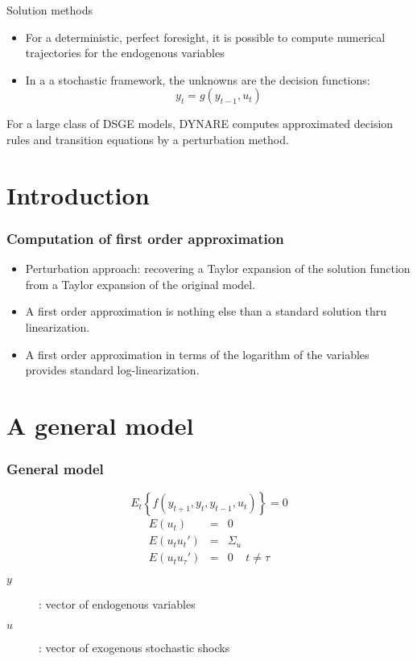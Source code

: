\documentclass{beamer}
\begin{document}
\begin{slide}{Solution methods}
\begin{itemize}
\item For a deterministic, perfect foresight, it is possible to compute
numerical trajectories for the endogenous variables
\item In a a stochastic framework, the unknowns are the decision functions:
\[
y_t = g(y_{t-1},u_t)
\]
\end{itemize}
For a large class of DSGE models, DYNARE computes approximated decision rules and transition equations by a perturbation method.
\end{slide}

\section[Introduction]{Introduction}
\begin{frame}
  \frametitle{Computation of first order approximation}

  \begin{itemize}
  \item Perturbation approach: recovering a Taylor expansion of the solution function from a Taylor expansion of the original model.
  \item A first order approximation is nothing else than a standard solution thru linearization.
  \item A first order approximation in terms of the logarithm of the variables provides standard log-linearization.
  \end{itemize}
\end{frame}

\section[A general model]{A general model}
\begin{frame}
\frametitle{General model}
\[
E_t\left\{f(y_{t+1},y_t,y_{t-1},u_t)\right\}=0
\]
\begin{eqnarray*}
E(u_t) &=& 0\\
E(u_tu_t') &=& \Sigma_u\\
E(u_tu_\tau') &=& 0\;\;\;\;t\ne\tau
\end{eqnarray*}

\begin{description}
  \item[$y$]: vector of endogenous variables
  \item[$u$]: vector of exogenous stochastic shocks
\end{description}
\end{frame}
\end{document}

